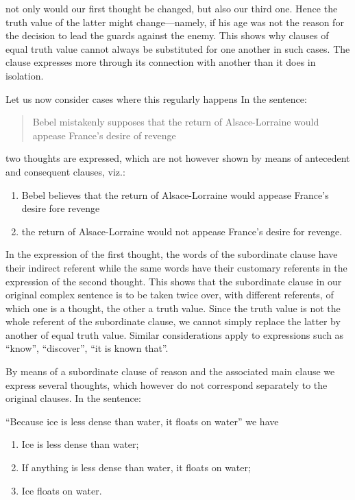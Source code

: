 \documentclass[twoside,12pt]{article}
\begin{document}
\noindent not only would our first thought be changed, but also our
third one. Hence the truth value of the latter might change---namely, if
his age was not the reason for the decision to lead the guards against
the enemy. This shows why clauses of equal truth value cannot always
be substituted for one another in such cases. The clause expresses
more through its connection with another than it does in isolation.

Let us now consider cases where this regularly happens In the
sentence:

\begin{quote}
  Bebel mistakenly supposes that the return of Alsace-Lorraine would
  appease France's desire of revenge
\end{quote}

two thoughts are expressed, which are not however shown by means of
antecedent and consequent clauses, viz.:

\begin{enumerate}[label={(\arabic*)}]
\item Bebel believes that the return of Alsace-Lorraine would appease
  France's desire fore revenge
\item {} the return of Alsace-Lorraine would not appease France's desire
  for revenge.
\end{enumerate}

In the expression of the first thought, the words of the subordinate
clause have their indirect referent while the same words have their
customary referents in the expression of the second thought. This
shows that the subordinate clause in our original complex sentence is
to be taken twice over, with different referents, of which one is a
thought, the other a truth value. Since the truth value is not the
whole referent of the subordinate clause, we cannot simply replace the
latter by another of equal truth value. Similar considerations apply
to expressions such as ``know'', ``discover'', ``it is known that''.

By means of a subordinate clause of reason and the associated main
clause we express several thoughts, which however do not correspond
separately to the original clauses. In the sentence:

``Because ice is less dense than water, it floats on water'' we have

\begin{enumerate}[label={(\arabic*)}]
\item Ice is less dense than water;
\item If anything is less dense than water, it floats on water;
\item Ice floats on water.
\end{enumerate}
\end{document}
